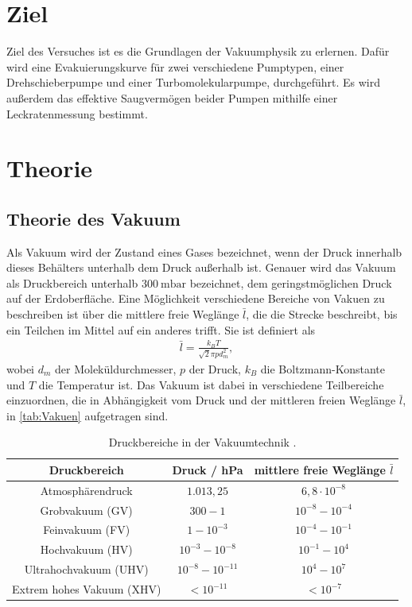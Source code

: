 \section{Ziel}
\label{sec:Ziel}

Ziel des Versuches ist es die Grundlagen der Vakuumphysik zu erlernen. Dafür wird eine Evakuierungskurve für zwei verschiedene Pumptypen, einer Drehschieberpumpe
und einer Turbomolekularpumpe, durchgeführt. Es wird außerdem das effektive Saugvermögen beider Pumpen mithilfe einer Leckratenmessung bestimmt.

\section{Theorie}
\label{sec:Theorie}

\subsection{Theorie des Vakuum}
\label{subsec:vakuum}

Als Vakuum wird der Zustand eines Gases bezeichnet, wenn der Druck innerhalb dieses Behälters unterhalb dem Druck außerhalb ist. Genauer wird das Vakuum als Druckbereich unterhalb
$\SI{300}{\milli\bar}$ bezeichnet, dem geringstmöglichen Druck auf der Erdoberfläche. Eine Möglichkeit verschiedene Bereiche von Vakuen zu beschreiben ist über die mittlere freie Weglänge $\bar l$, die die
Strecke beschreibt, bis ein Teilchen im Mittel auf ein anderes trifft. Sie ist definiert als
\begin{align}
    \bar l = \frac{k_B T}{\sqrt 2 \pi p d_m^2},
\end{align}
wobei $d_m$ der Moleküldurchmesser, $p$ der Druck, $k_B$ die Boltzmann-Konstante und $T$ die Temperatur ist.
Das Vakuum ist dabei in verschiedene Teilbereiche einzuordnen, die in Abhängigkeit vom Druck
und der mittleren freien Weglänge $\bar l$, in \autoref{tab:Vakuen} aufgetragen sind.

\begin{table}[H]
    \centering
    \caption{Druckbereiche in der Vakuumtechnik \cite{EinfuehrungVakuum}.}
    \label{tab:Vakuen}
    \begin{tabular}{c c c}
        \toprule
        Druckbereich & Druck / hPa &  mittlere freie Weglänge $\bar l$\\
        \midrule
        Atmosphärendruck    & $1.013,25$    & $6,8\cdot10^{-8}$   \\
        Grobvakuum (GV)     & $300 - 1$     & $10^{-8}-10^{-4}$   \\
        Feinvakuum (FV)     & $1 - 10^{-3}$ & $10^{-4} - 10^{-1}$ \\
        Hochvakuum (HV)     & $10^{-3} - 10^{-8}$ & $10^{-1} - 10^{4}$ \\
        Ultrahochvakuum (UHV) & $10^{-8} - 10^{-11}$ & $10^{4} - 10^{7}$ \\
        Extrem hohes Vakuum (XHV) & $<10^{-11}$ & $<10^{-7}$ \\
        \bottomrule
    \end{tabular}
\end{table}

